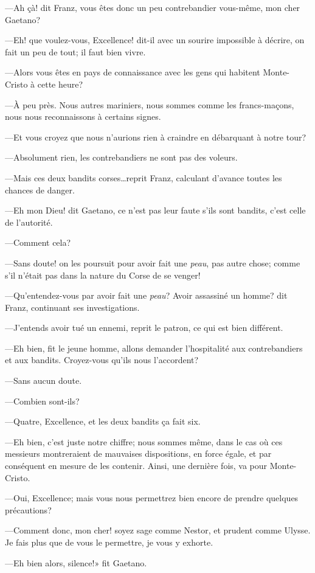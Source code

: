 —Ah çà! dit Franz, vous êtes donc un peu contrebandier vous-même, mon cher Gaetano?

—Eh! que voulez-vous, Excellence! dit-il avec un sourire impossible à décrire, on fait un peu de tout; il faut bien vivre.

—Alors vous êtes en pays de connaissance avec les gens qui habitent Monte-Cristo à cette heure?

—À peu près. Nous autres mariniers, nous sommes comme les francs-maçons, nous nous reconnaissons à certains signes.

—Et vous croyez que nous n'aurions rien à craindre en débarquant à notre tour?

—Absolument rien, les contrebandiers ne sont pas des voleurs.

—Mais ces deux bandits corses\dots reprit Franz, calculant d'avance toutes les chances de danger.

—Eh mon Dieu! dit Gaetano, ce n'est pas leur faute s'ils sont bandits, c'est celle de l'autorité.

—Comment cela?

—Sans doute! on les poursuit pour avoir fait une \textit{peau}, pas autre chose; comme s'il n'était pas dans la nature du Corse de se venger!

—Qu'entendez-vous par avoir fait une \textit{peau}? Avoir assassiné un homme? dit Franz, continuant ses investigations.

—J'entends avoir tué un ennemi, reprit le patron, ce qui est bien différent.

—Eh bien, fit le jeune homme, allons demander l'hospitalité aux contrebandiers et aux bandits. Croyez-vous qu'ils nous l'accordent?

—Sans aucun doute.

—Combien sont-ils?

—Quatre, Excellence, et les deux bandits ça fait six.

—Eh bien, c'est juste notre chiffre; nous sommes même, dans le cas où ces messieurs montreraient de mauvaises dispositions, en force égale, et par conséquent en mesure de les contenir. Ainsi, une dernière fois, va pour Monte-Cristo.

—Oui, Excellence; mais vous nous permettrez bien encore de prendre quelques précautions?

—Comment donc, mon cher! soyez sage comme Nestor, et prudent comme Ulysse. Je fais plus que de vous le permettre, je vous y exhorte.

—Eh bien alors, silence!» fit Gaetano.

